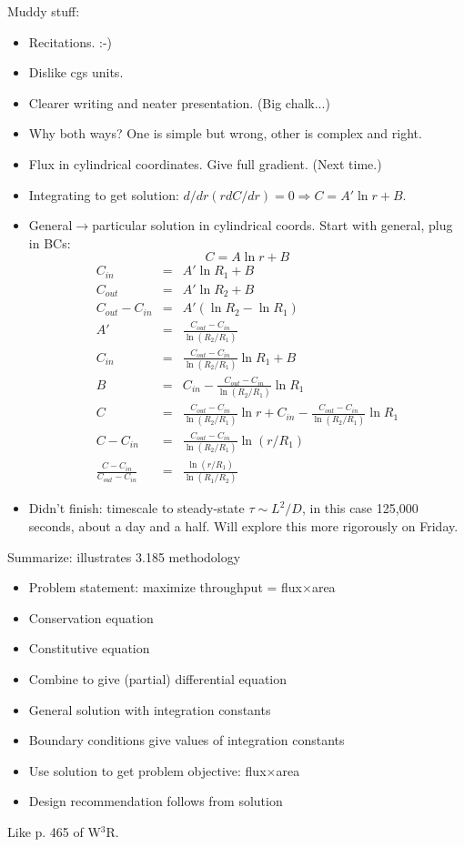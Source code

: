 \documentclass{report}
\begin{document}
\noindent Muddy stuff:
\begin{itemize}
\item Recitations. :-)
\item Dislike cgs units.
\item Clearer writing and neater presentation.  (Big chalk...)
\item Why both ways?  One is simple but wrong, other is complex and right.
\item Flux in cylindrical coordinates.  Give full gradient. (Next time.)
\item Integrating to get solution: $d/dr(rdC/dr)=0\Rightarrow C=A'\ln r+B$.

\item General$\longrightarrow$particular solution in cylindrical coords.  Start
  with general, plug in BCs:
  \begin{equation}
    \label{eq:cylstdgen}
    C = A\ln r + B
  \end{equation}
  \begin{eqnarray}
    \label{eq:cylstdconcderive}
    C_{in} &=& A'\ln R_1 + B \\
    C_{out} &=& A'\ln R_2 + B \\
    C_{out} - C_{in} &=& A'(\ln R_2 - \ln R_1) \\
    A' &=& \frac{C_{out} - C_{in}}{\ln (R_2/R_1)} \\
    C_{in} &=& \frac{C_{out} - C_{in}}{\ln (R_2/R_1)}\ln R_1 + B \\
    B &=& C_{in} - \frac{C_{out} - C_{in}}{\ln (R_2/R_1)}\ln R_1 \\
    C &=& \frac{C_{out} - C_{in}}{\ln (R_2/R_1)}\ln r + 
    C_{in} - \frac{C_{out} - C_{in}}{\ln (R_2/R_1)}\ln R_1 \\
    C-C_{in} &=& \frac{C_{out} - C_{in}}{\ln (R_2/R_1)} \ln (r/R_1) \\
    \frac{C-C_{in}}{C_{out}-C_{in}} &=& \frac{\ln (r/R_1)}{\ln (R_1/R_2)}
  \end{eqnarray}

\item Didn't finish: timescale to steady-state $\tau\sim L^2/D$, in this case
  125,000 seconds, about a day and a half.  Will explore this more rigorously
  on Friday.
\end{itemize}
Summarize: illustrates 3.185 methodology
\begin{itemize}
\item Problem statement: maximize throughput = flux$\times$area
\item Conservation equation
\item Constitutive equation
\item Combine to give (partial) differential equation
\item General solution with integration constants
\item Boundary conditions give values of integration constants
\item Use solution to get problem objective: flux$\times$area
\item Design recommendation follows from solution
\end{itemize}
Like p. 465 of W$^3$R.
\end{document}
